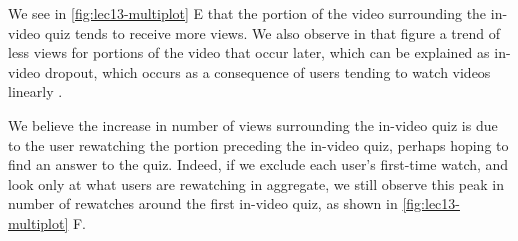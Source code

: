 \documentclass{sigchi}
\begin{document}
We see in \autoref{fig:lec13-multiplot} E that the portion of the video surrounding the in-video quiz tends to receive more views. We also observe in that figure a trend of less views for portions of the video that occur later, which can be explained as in-video dropout, which occurs as a consequence of users tending to watch videos linearly \cite{juho}.

We believe the increase in number of views surrounding the in-video quiz is due to the user rewatching the portion preceding the in-video quiz, perhaps hoping to find an answer to the quiz. Indeed, if we exclude each user's first-time watch, and look only at what users are rewatching in aggregate, we still observe this peak in number of rewatches around the first in-video quiz, as shown in \autoref{fig:lec13-multiplot} F. %


\end{document}
